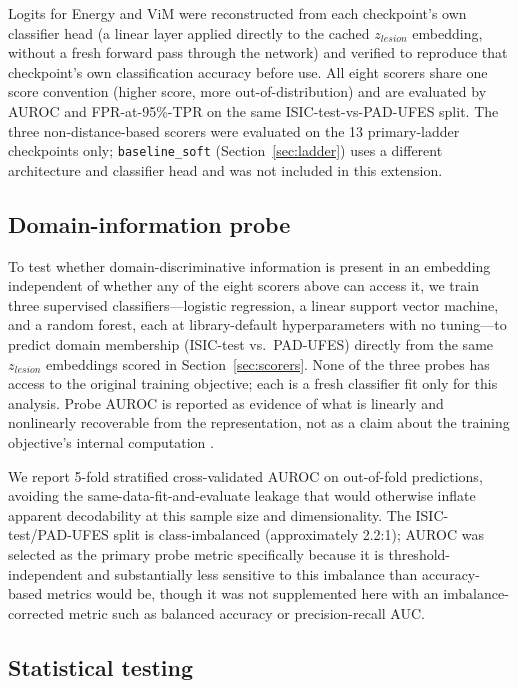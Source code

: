 Logits for Energy and ViM were reconstructed from each checkpoint's own classifier head (a linear layer applied directly to the cached $z_{lesion}$ embedding, without a fresh forward pass through the network) and verified to reproduce that checkpoint's own classification accuracy before use. All eight scorers share one score convention (higher score, more out-of-distribution) and are evaluated by AUROC and FPR-at-95\%-TPR on the same ISIC-test-vs-PAD-UFES split. The three non-distance-based scorers were evaluated on the 13 primary-ladder checkpoints only; \texttt{baseline\_soft} (Section~\ref{sec:ladder}) uses a different architecture and classifier head and was not included in this extension.

\subsection{Domain-information probe}
\label{sec:probe}

To test whether domain-discriminative information is present in an embedding independent of whether any of the eight scorers above can access it, we train three supervised classifiers---logistic regression, a linear support vector machine, and a random forest, each at library-default hyperparameters with no tuning---to predict domain membership (ISIC-test vs.\ PAD-UFES) directly from the same $z_{lesion}$ embeddings scored in Section~\ref{sec:scorers}. None of the three probes has access to the original training objective; each is a fresh classifier fit only for this analysis. Probe AUROC is reported as evidence of what is linearly and nonlinearly recoverable from the representation, not as a claim about the training objective's internal computation \citep{hewitt2019designing}.

We report 5-fold stratified cross-validated AUROC on out-of-fold predictions, avoiding the same-data-fit-and-evaluate leakage that would otherwise inflate apparent decodability at this sample size and dimensionality. The ISIC-test/PAD-UFES split is class-imbalanced (approximately 2.2:1); AUROC was selected as the primary probe metric specifically because it is threshold-independent and substantially less sensitive to this imbalance than accuracy-based metrics would be, though it was not supplemented here with an imbalance-corrected metric such as balanced accuracy or precision-recall AUC.

\subsection{Statistical testing}
\label{sec:stats}

